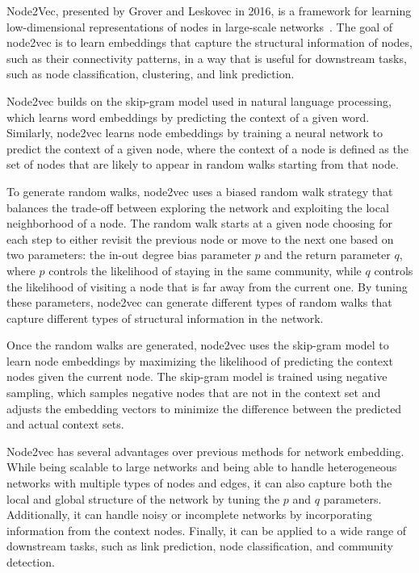 Node2Vec, presented by Grover and Leskovec in 2016, is a framework for learning low-dimensional representations of nodes in large-scale networks~\cite{2016node2vec}. The goal of node2vec is to learn embeddings that capture the structural information of nodes, such as their connectivity patterns, in a way that is useful for downstream tasks, such as node classification, clustering, and link prediction.

Node2vec builds on the skip-gram model used in natural language processing, which learns word embeddings by predicting the context of a given word. Similarly, node2vec learns node embeddings by training a neural network to predict the context of a given node, where the context of a node is defined as the set of nodes that are likely to appear in random walks starting from that node.

To generate random walks, node2vec uses a biased random walk strategy that balances the trade-off between exploring the network and exploiting the local neighborhood of a node. The random walk starts at a given node choosing for each step to either revisit the previous node or move to the next one based on two parameters: the in-out degree bias parameter $p$ and the return parameter $q$, where $p$ controls the likelihood of staying in the same community, while $q$ controls the likelihood of visiting a node that is far away from the current one. By tuning these parameters, node2vec can generate different types of random walks that capture different types of structural information in the network.

Once the random walks are generated, node2vec uses the skip-gram model to learn node embeddings by maximizing the likelihood of predicting the context nodes given the current node. The skip-gram model is trained using negative sampling, which samples negative nodes that are not in the context set and adjusts the embedding vectors to minimize the difference between the predicted and actual context sets.

Node2vec has several advantages over previous methods for network embedding. While being scalable to large networks and being able to handle heterogeneous networks with multiple types of nodes and edges, it can also capture both the local and global structure of the network by tuning the $p$ and $q$ parameters. Additionally, it can handle noisy or incomplete networks by incorporating information from the context nodes. Finally, it can be applied to a wide range of downstream tasks, such as link prediction, node classification, and community detection.

